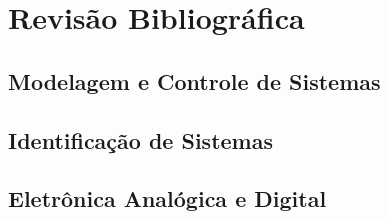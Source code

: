 \chapter{Revisão Bibliográfica}

\lipsum[1] %

\section{Modelagem e Controle de Sistemas}


\section{ Identificação de Sistemas}


\section{ Eletrônica Analógica e Digital}
